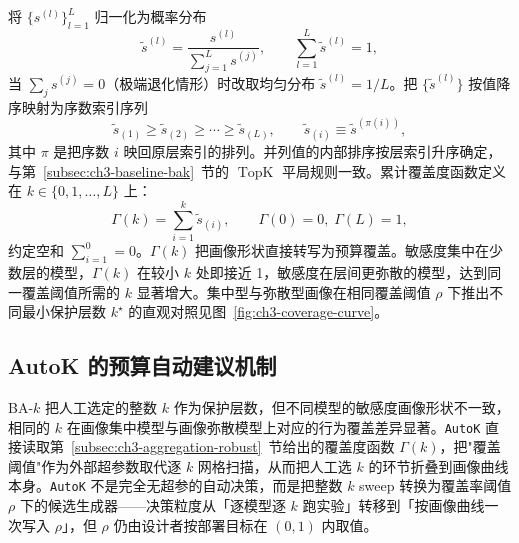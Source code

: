 将 $\{s^{(l)}\}_{l=1}^L$ 归一化为概率分布
\begin{equation}
\tilde s^{(l)}
=
\frac{s^{(l)}}{\sum_{j=1}^{L}s^{(j)}},
\qquad
\sum_{l=1}^{L}\tilde s^{(l)}=1,
\end{equation}
当 $\sum_j s^{(j)}=0$（极端退化情形）时改取均匀分布 $\tilde s^{(l)}=1/L$。把 $\{\tilde s^{(l)}\}$ 按值降序映射为序数索引序列
\begin{equation}
\tilde s_{(1)}\ge \tilde s_{(2)}\ge \cdots \ge \tilde s_{(L)},
\qquad
\tilde s_{(i)}\equiv \tilde s^{(\pi(i))},
\end{equation}
其中 $\pi$ 是把序数 $i$ 映回原层索引的排列。并列值的内部排序按层索引升序确定，与第~\ref{subsec:ch3-baseline-bak}~节的 $\operatorname{TopK}$ 平局规则一致。累计覆盖度函数定义在 $k\in\{0,1,\dots,L\}$ 上：
\begin{equation}
\Gamma(k)
=
\sum_{i=1}^{k}\tilde s_{(i)},
\qquad
\Gamma(0)=0,\;\Gamma(L)=1,
\end{equation}
约定空和 $\sum_{i=1}^{0}=0$。$\Gamma(k)$ 把画像形状直接转写为预算覆盖。敏感度集中在少数层的模型，$\Gamma(k)$ 在较小 $k$ 处即接近 1，敏感度在层间更弥散的模型，达到同一覆盖阈值所需的 $k$ 显著增大。集中型与弥散型画像在相同覆盖阈值 $\rho$ 下推出不同最小保护层数 $k^\star$ 的直观对照见图~\ref{fig:ch3-coverage-curve}。



\subsection{AutoK 的预算自动建议机制}
\label{sec:ch3-autok}

BA-$k$ 把人工选定的整数 $k$ 作为保护层数，但不同模型的敏感度画像形状不一致，相同的 $k$ 在画像集中模型与画像弥散模型上对应的行为覆盖差异显著。\texttt{AutoK} 直接读取第~\ref{subsec:ch3-aggregation-robust}~节给出的覆盖度函数 $\Gamma(k)$，把"覆盖阈值"作为外部超参数取代逐 $k$ 网格扫描，从而把人工选 $k$ 的环节折叠到画像曲线本身。\texttt{AutoK} 不是完全无超参的自动决策，而是把整数 $k$ sweep 转换为覆盖率阈值 $\rho$ 下的候选生成器——决策粒度从「逐模型逐 $k$ 跑实验」转移到「按画像曲线一次写入 $\rho$」，但 $\rho$ 仍由设计者按部署目标在 $(0,1)$ 内取值。

